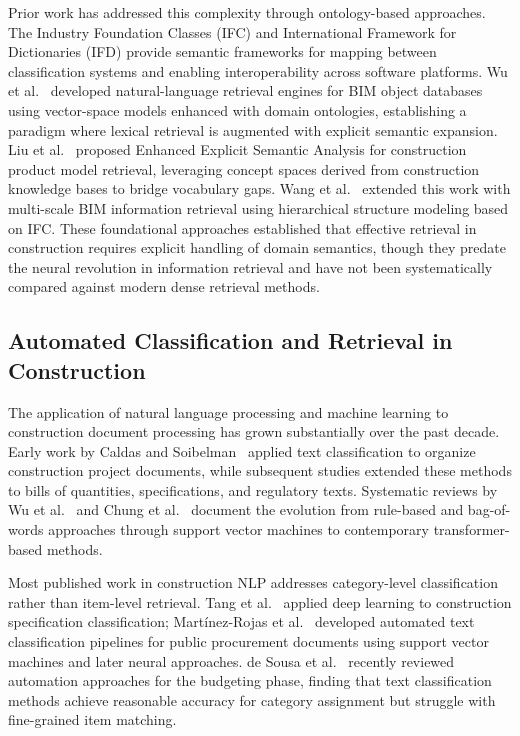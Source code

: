 \documentclass[preprint,review,12pt]{elsarticle}
\begin{document}
Prior work has addressed this complexity through ontology-based approaches. The Industry Foundation Classes (IFC) and International Framework for Dictionaries (IFD) provide semantic frameworks for mapping between classification systems and enabling interoperability across software platforms. Wu et al.~\cite{wuNaturallanguagebasedIntelligentRetrieval2019} developed natural-language retrieval engines for BIM object databases using vector-space models enhanced with domain ontologies, establishing a paradigm where lexical retrieval is augmented with explicit semantic expansion. Liu et al.~\cite{43f8dc68b3d05e73df8185c5a051e207a64e4ed4} proposed Enhanced Explicit Semantic Analysis for construction product model retrieval, leveraging concept spaces derived from construction knowledge bases to bridge vocabulary gaps. Wang et al.~\cite{wangMultiscaleInformationRetrieval2021} extended this work with multi-scale BIM information retrieval using hierarchical structure modeling based on IFC. These foundational approaches established that effective retrieval in construction requires explicit handling of domain semantics, though they predate the neural revolution in information retrieval and have not been systematically compared against modern dense retrieval methods.

\subsection{Automated Classification and Retrieval in Construction}

The application of natural language processing and machine learning to construction document processing has grown substantially over the past decade. Early work by Caldas and Soibelman~\cite{caldasAutomatingHierarchicalDocument2003} applied text classification to organize construction project documents, while subsequent studies extended these methods to bills of quantities, specifications, and regulatory texts. Systematic reviews by Wu et al.~\cite{wuNaturalLanguageProcessing2022} and Chung et al.~\cite{chungComparingNaturalLanguage2023} document the evolution from rule-based and bag-of-words approaches through support vector machines to contemporary transformer-based methods.

Most published work in construction NLP addresses category-level classification rather than item-level retrieval. Tang et al.~\cite{tangAutomatedConstructionQuantity2022} applied deep learning to construction specification classification; Martínez-Rojas et al.~\cite{martinez-rojasUsingClassificationTechniques2018} developed automated text classification pipelines for public procurement documents using support vector machines and later neural approaches. de Sousa et al.~\cite{ebef73f3fbc92afecc62385adfa62bfe418b6749} recently reviewed automation approaches for the budgeting phase, finding that text classification methods achieve reasonable accuracy for category assignment but struggle with fine-grained item matching.
\end{document}
